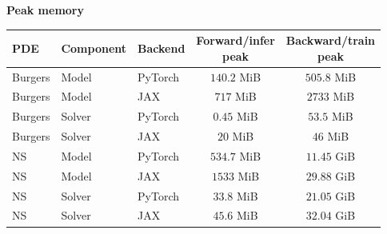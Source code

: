 \begin{center}
\vspace{0.6em}
\textbf{Peak memory}\par\smallskip
\begin{tabular}{@{}lllcc@{}}
\toprule
PDE & Component & Backend & \shortstack{Forward/infer\\peak} &
\shortstack{Backward/train\\peak} \\
\midrule
Burgers & Model & PyTorch & $140.2$ MiB & $505.8$ MiB \\
Burgers & Model & JAX & $717$ MiB & $2733$ MiB \\
Burgers & Solver & PyTorch & $0.45$ MiB & $53.5$ MiB \\
Burgers & Solver & JAX & $20$ MiB & $46$ MiB \\
NS & Model & PyTorch & $534.7$ MiB & $11.45$ GiB \\
NS & Model & JAX & $1533$ MiB & $29.88$ GiB \\
NS & Solver & PyTorch & $33.8$ MiB & $21.05$ GiB \\
NS & Solver & JAX & $45.6$ MiB & $32.04$ GiB \\
\bottomrule
\end{tabular}
\end{center}
\vspace{0.2em}

